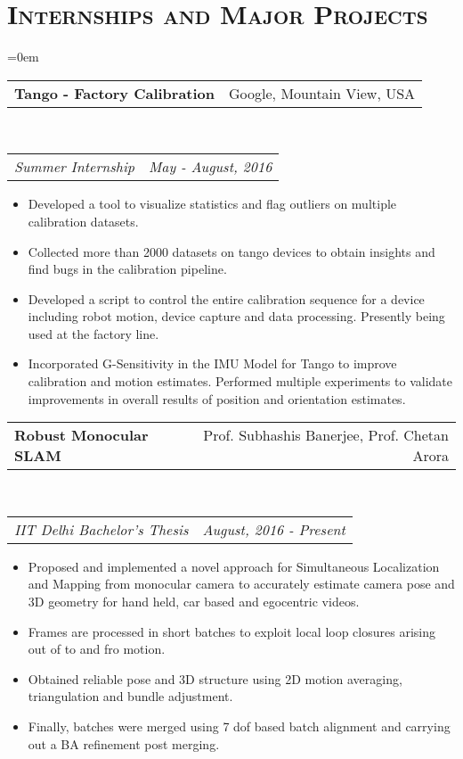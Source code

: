 \documentclass{article}
\makeatletter
\newcommand{\headerrow}[2]
{\begin{tabular*}{\linewidth}{l@{\extracolsep{\fill}}r}
	#1 &
	#2 \\
\end{tabular*}}
\newcommand{\tmpsection}[1]{}
\let\tmpsection=\section
\renewcommand{\section}[1]{\tmpsection*{\textsc{#1}}}
\makeatother
\begin{document}
\section{Internships and Major Projects}
\begin{list} {}{\leftmargin=0em}
\setlength{\leftmargin}{0pt}
\item[]
  \headerrow
    {\textbf{Tango - Factory Calibration}}
    {Google, Mountain View, USA}
  \\
  \headerrow
    {\emph{Summer Internship}}
    {\emph{May - August, 2016}}
      \begin{itemize}
        \item Developed a tool to visualize statistics and flag outliers on multiple calibration datasets. 
        \item Collected more than 2000 datasets on tango devices to obtain insights and find bugs in the calibration pipeline.
        \item Developed a script to control the entire calibration sequence for a device including robot motion, device capture and data processing. Presently being used at the factory line.
        \item Incorporated G-Sensitivity in the IMU Model for Tango to improve calibration and motion estimates. Performed multiple experiments to validate improvements in overall results of position and orientation estimates.
      \end{itemize}

\item[]
  \headerrow
    {\textbf{Robust Monocular SLAM}}
    {Prof. Subhashis Banerjee, Prof. Chetan Arora}
  \\
  \headerrow
    {\emph{IIT Delhi Bachelor's Thesis}}
    {\emph{August, 2016 - Present}}
      \begin{itemize}
        \item Proposed and implemented a novel approach for Simultaneous Localization and Mapping from monocular camera to accurately estimate camera pose and 3D geometry for hand held, car based and egocentric videos.
        \item Frames are processed in short batches to exploit local loop closures arising out of to and fro motion.
        \item Obtained reliable pose and 3D structure using 2D motion averaging, triangulation and bundle adjustment.
        \item Finally, batches were merged using 7 dof based batch alignment and carrying out a BA refinement post merging.
      \end{itemize}


\end{list}
\end{document}
